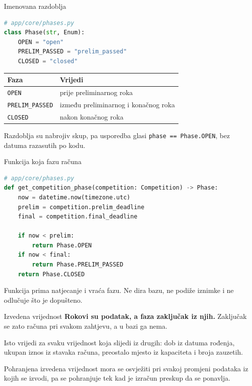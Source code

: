 \begin{frame}[fragile]{Imenovana razdoblja}
\begin{lstlisting}[language=python]
# app/core/phases.py
class Phase(str, Enum):
    OPEN = "open"
    PRELIM_PASSED = "prelim_passed"
    CLOSED = "closed"
\end{lstlisting}

\vspace{0.35em}
\begin{center}
{\small
\setlength{\tabcolsep}{0pt}
\renewcommand{\arraystretch}{1.2}
\begin{tabular}{@{}L{3.6cm}L{7.4cm}@{}}
  \toprule
  \textbf{Faza} & \textbf{Vrijedi} \\
  \midrule
  \texttt{OPEN}          & prije preliminarnog roka \\
  \texttt{PRELIM\_PASSED} & između preliminarnog i konačnog roka \\
  \texttt{CLOSED}        & nakon konačnog roka \\
  \bottomrule
\end{tabular}
}
\end{center}

\vspace{0.5em}
Razdoblja su nabrojiv skup, pa usporedba glasi \texttt{phase == Phase.OPEN}, bez datuma razasutih po kodu.
\end{frame}

\begin{frame}[fragile]{Funkcija koja fazu računa}
\begin{lstlisting}[language=python]
# app/core/phases.py
def get_competition_phase(competition: Competition) -> Phase:
    now = datetime.now(timezone.utc)
    prelim = competition.prelim_deadline
    final = competition.final_deadline

    if now < prelim:
        return Phase.OPEN
    if now < final:
        return Phase.PRELIM_PASSED
    return Phase.CLOSED
\end{lstlisting}

\vspace{0.3em}
Funkcija prima natjecanje i vraća fazu. Ne dira bazu, ne podiže iznimke i ne odlučuje što je dopušteno.
\end{frame}

\begin{frame}{Izvedena vrijednost}
\textbf{Rokovi su podatak, a faza zaključak iz njih.} Zaključak se zato računa pri svakom zahtjevu, a u bazi ga nema.

\vspace{0.9em}
Isto vrijedi za svaku vrijednost koja slijedi iz drugih: dob iz datuma rođenja, ukupan iznos iz stavaka računa, preostalo mjesto iz kapaciteta i broja zauzetih.

\vspace{0.9em}
Pohranjena izvedena vrijednost mora se osvježiti pri svakoj promjeni podataka iz kojih se izvodi, pa se pohranjuje tek kad je izračun preskup da se ponavlja.
\end{frame}

